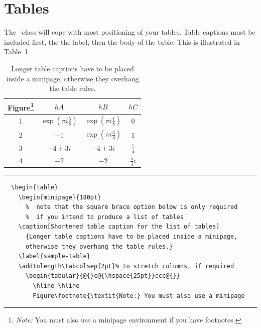\section{Tables}

The \cambridge\ class will cope with most positioning of your tables. Table captions must be included first, the the label, then the body of the table. This is illustrated in Table~\ref{sample-table}.
  \begin{table}
    \begin{minipage}{180pt}
    \caption[Shortened table caption for the list of tables]
      {Longer table captions have to be placed inside a minipage,
      otherwise they overhang the table rules.}
    \label{sample-table}
    \addtolength\tabcolsep{2pt}%
      \begin{tabular}{@{}c@{\hspace{25pt}}ccc@{}}
        \hline \hline
        Figure\footnote{\textit{Note:} You must also use a minipage
          environment if you have footnotes.} & $hA$ & $hB$ & $hC$\\
        \hline
        1 & $\exp\left(\pi i\frac58\right)$
          & $\exp\left(\pi i\frac18\right)$ & $0$\\[3pt]
        2 & $-1$    & $\exp\left(\pi i\frac34\right)$ & $1$\\[10pt]
        3 & $-4+3i$ & $-4+3i$ & $\frac74$\\[3pt]
        4 & $-2$    & $-2$    & $\frac54 i$ \\
        \hline \hline
      \end{tabular}
    \end{minipage}
    \rule[-20pt]{\textwidth}{0.5pt}
\begin{verbatim}
  \begin{table}
    \begin{minipage}{180pt}
      %  note that the square brace option below is only required
      %  if you intend to produce a list of tables
    \caption[Shortened table caption for the list of tables]
      {Longer table captions have to be placed inside a minipage,
      otherwise they overhang the table rules.}
    \label{sample-table}
    \addtolength\tabcolsep{2pt}% to stretch columns, if required
      \begin{tabular}{@{}c@{\hspace{25pt}}ccc@{}}
        \hline \hline
        Figure\footnote{\textit{Note:} You must also use a minipage

\end{verbatim}
\end{table}
